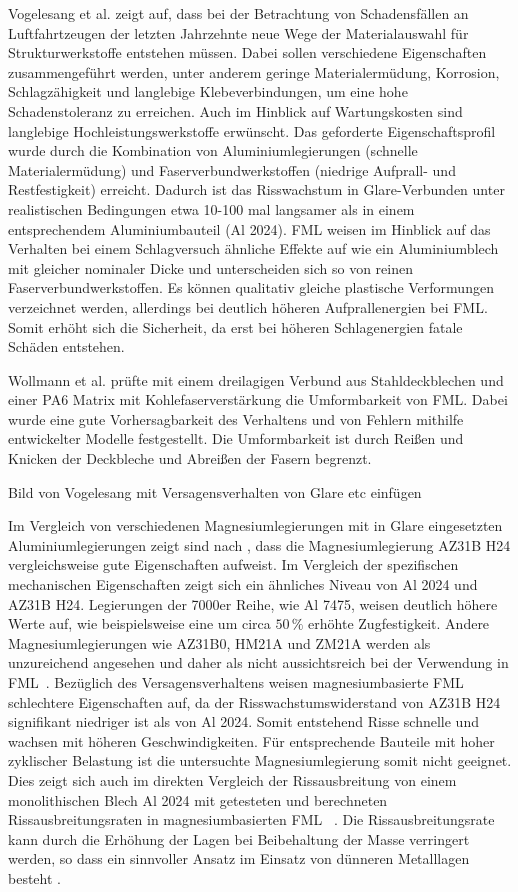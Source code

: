 Vogelesang et al. \cite{Vogelesang.2000} zeigt auf, dass bei der Betrachtung von Schadensfällen an Luftfahrtzeugen der letzten Jahrzehnte neue Wege der Materialauswahl für Strukturwerkstoffe entstehen müssen.
Dabei sollen verschiedene Eigenschaften zusammengeführt werden, unter anderem geringe Materialermüdung, Korrosion, Schlagzähigkeit und langlebige Klebeverbindungen, um eine hohe Schadenstoleranz zu erreichen.
Auch im Hinblick auf Wartungskosten sind langlebige Hochleistungswerkstoffe erwünscht.
Das geforderte Eigenschaftsprofil wurde durch die Kombination von Aluminiumlegierungen (schnelle Materialermüdung) und Faserverbundwerkstoffen (niedrige Aufprall- und Restfestigkeit) erreicht.
Dadurch ist das Risswachstum in Glare-Verbunden unter realistischen Bedingungen etwa 10-100 mal langsamer als in einem entsprechendem Aluminiumbauteil (Al 2024).
FML weisen im Hinblick auf das Verhalten bei einem Schlagversuch ähnliche Effekte auf wie ein Aluminiumblech mit gleicher nominaler Dicke und unterscheiden sich so von reinen Faserverbundwerkstoffen.
Es können qualitativ gleiche plastische Verformungen verzeichnet werden, allerdings bei deutlich höheren Aufprallenergien bei FML.
Somit erhöht sich die Sicherheit, da erst bei höheren Schlagenergien fatale Schäden entstehen.

Wollmann et al. \cite{Wollmann.2018} prüfte mit einem dreilagigen Verbund aus Stahldeckblechen und einer PA6 Matrix mit Kohlefaserverstärkung die Umformbarkeit von FML.
Dabei wurde eine gute Vorhersagbarkeit des Verhaltens und von Fehlern mithilfe entwickelter Modelle festgestellt.
Die Umformbarkeit ist durch Reißen und Knicken der Deckbleche und Abreißen der Fasern begrenzt.

Bild von Vogelesang mit Versagensverhalten von Glare etc einfügen

Im Vergleich von verschiedenen Magnesiumlegierungen mit in Glare eingesetzten Aluminiumlegierungen zeigt sind nach \cite{Alderliesten.2008}, dass die Magnesiumlegierung AZ31B H24 vergleichsweise gute Eigenschaften aufweist.
Im Vergleich der spezifischen mechanischen Eigenschaften zeigt sich ein ähnliches Niveau von Al 2024 und AZ31B H24.
Legierungen der 7000er Reihe, wie Al 7475, weisen deutlich höhere Werte auf, wie beispielsweise eine um circa $50\,\%$ erhöhte Zugfestigkeit.
Andere Magnesiumlegierungen wie AZ31B0, HM21A und ZM21A werden als unzureichend angesehen und daher als nicht aussichtsreich bei der Verwendung in FML~.
Bezüglich des Versagensverhaltens weisen magnesiumbasierte FML schlechtere Eigenschaften auf, da der Risswachstumswiderstand von AZ31B H24 signifikant niedriger ist als von Al 2024.
Somit entstehend Risse schnelle und wachsen mit höheren Geschwindigkeiten.
Für entsprechende Bauteile mit hoher zyklischer Belastung ist die untersuchte Magnesiumlegierung somit nicht geeignet.
Dies zeigt sich auch im direkten Vergleich der Rissausbreitung von einem monolithischen Blech Al 2024 mit getesteten und berechneten Rissausbreitungsraten in magnesiumbasierten FML \cite{Alderliesten.2018,Cortes.2005}~.
Die Rissausbreitungsrate kann durch die Erhöhung der Lagen bei Beibehaltung der Masse verringert werden, so dass ein sinnvoller Ansatz im Einsatz von dünneren Metalllagen besteht \cite{Alderliesten.2008}.

